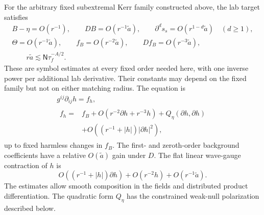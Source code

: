 \begin{lemma}\label{far:structure}
For the arbitrary fixed subextremal Kerr family constructed above, the
lab target satisfies
\begin{equation}\label{far:target-symbols}
 \begin{gathered}
 B-\eta=O(r^{-1}),\qquad DB=O(r^{-1}\widetilde a),\qquad
 \partial^ds_s=O(r^{1-d}\widetilde a)\quad(d\ge1),\\
 \Theta=O(r^{-1}\widetilde a),\qquad
 f_B=O(r^{-2}\widetilde a),\qquad Df_B=O(r^{-3}\widetilde a),\\
 \qquad r\widetilde a\lesssim\mathsf N\tau_f^{-A/2}.
 \end{gathered}
\end{equation}
These are symbol estimates at every fixed order needed here, with one
inverse power per additional lab derivative.  Their constants may depend
on the fixed family but not on either matching radius.  The equation is
\begin{equation}\label{far:wave-structure}
 \begin{gathered}
 g^{ij}\partial_{ij}h=f_h,\\
 \begin{aligned}
 f_h={}&f_B+O(r^{-2}\partial h+r^{-3}h)
             +Q_\eta(\partial h,\partial h)\\
       &+O((r^{-1}+|h|)|\partial h|^2),
 \end{aligned}
 \end{gathered}
\end{equation}
up to fixed harmless changes in $f_B$.  The first- and zeroth-order
background coefficients have a relative $O(\widetilde a)$ gain under
$D$.  The flat linear wave-gauge contraction of $h$ is
\begin{equation}\label{far:flat-gauge}
 O((r^{-1}+|h|)\partial h)+O(r^{-2}h)
                              +O(r^{-1}\widetilde a).
\end{equation}
The estimates allow smooth composition in the fields and distributed
product differentiation.  The quadratic form $Q_\eta$ has the constrained
weak-null polarization described below.
\end{lemma}

